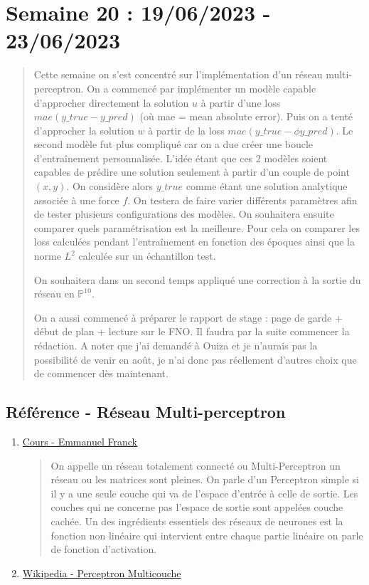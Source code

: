 \section{Semaine 20 : 19/06/2023 - 23/06/2023}
\graphicspath{{semaines/semaine_20/images/}}

\begin{abstract}
	Cette semaine on s'est concentré sur l'implémentation d'un réseau multi-perceptron. On a commencé par implémenter un modèle capable d'approcher directement la solution $u$ à partir d'une loss $mae(y\_true-y\_pred)$ (où mae = mean absolute error). Puis on a tenté d'approcher la solution $w$ à partir de la loss $mae(y\_true-\phi y\_pred)$. Le second modèle fut plus compliqué car on a due créer une boucle d'entraînement personnalisée. L'idée étant que ces 2 modèles soient capables de prédire une solution seulement à partir d'un couple de point $(x,y)$. On considère alors $y\_true$ comme étant une solution analytique associée à une force $f$. On testera de faire varier différents paramètres afin de tester plusieurs configurations des modèles. On souhaitera ensuite comparer quels paramétrisation est la meilleure. Pour cela on comparer les loss calculées pendant l'entraînement en fonction des époques ainsi que la norme $L^2$ calculée sur un échantillon test.
	
	On souhaitera dans un second temps appliqué une correction à la sortie du réseau en $\mathbb{P}^{10}$. 
	
	On a aussi commencé à préparer le rapport de stage : page de garde + début de plan + lecture sur le FNO. Il faudra par la suite commencer la rédaction. A noter que j'ai demandé à Ouiza et je n'aurais pas la possibilité de venir en août, je n'ai donc pas réellement d'autres choix que de commencer dès maintenant.
\end{abstract}

\subsection{Référence - Réseau Multi-perceptron}

\begin{enumerate}[label=\textbullet]
	\item\href{https://irma.math.unistra.fr/~franck/cours/SciML/output/html/chapAP_sec1.html}{Cours - Emmanuel Franck}
	
	\begin{quote}
		On appelle un réseau totalement connecté ou Multi-Perceptron un réseau ou les matrices sont pleines. On parle d'un Perceptron simple si il y a une seule couche qui va de l'espace d'entrée à celle de sortie. Les couches qui ne concerne pas l'espace de sortie sont appelées couche cachée. Un des ingrédients essentiels des réseaux de neurones est la fonction non linéaire qui intervient entre chaque partie linéaire on parle de fonction d'activation.
	\end{quote}

	\item\href{https://fr.wikipedia.org/wiki/Perceptron_multicouche}{Wikipedia - Perceptron Multicouche}
\end{enumerate}

